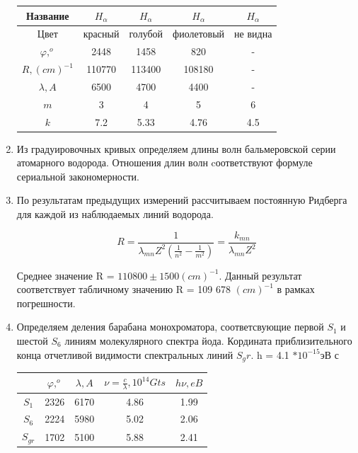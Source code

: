\documentclass[a4paper,12pt]{article}
\begin{document}
\begin{enumerate}
  \begin{table}[H]
\begin{center}
\begin{tabular}{|c|c|c|c|c|}
\hline Название&$H_{\alpha}$&$H_{\alpha}$&$H_{\alpha}$&$H_{\alpha}$\\
\hline Цвет&красный&голубой&фиолетовый&не видна\\
\hline $\varphi , ^{o}$&2448&1458&820&-\\
\hline $R, (cm)^{-1}$&110770&113400&108180&-\\
\hline $\lambda , A$&6500&4700&4400&-\\
\hline $m$&3&4&5&6\\
\hline $k$&7.2&5.33&4.76&4.5\\
\hline 
\end{tabular}
\end{center}
\end{table}

\item Из градуировочных кривых определяем длины волн бальмеровской серии атомарного водорода. Отношения длин волн cоответствуют формуле сериальной закономерности.


\item По результатам предыдущих измерений рассчитываем постоянную Ридберга для каждой из наблюдаемых линий водорода.

\[R = \frac{1}{\lambda_{mn} Z^2 (\frac{1}{n^2} - \frac{1}{m^2})} = \frac{k_{mn}}{\lambda_{mn} Z^2}\]

Среднее значение R = $110800 \pm 1500 (cm)^{-1}$. Данный результат соответствует табличному значению R = 109 678 $(cm)^{-1}$ в рамках погрешности.


\item Определяем деления барабана монохроматора, соответсвующие первой $S_1$ и шестой $S_6$ линиям молекулярного спектра йода. Кордината приблизительного конца отчетливой видимости спектральных линий $S_gr$. h = 4.1 $*10^{-15}$эВ с


  \begin{table}[H]
\begin{center}
\begin{tabular}{|c|c|c|c|c|}
\hline &$\varphi, ^{o}$&$\lambda ,A$&$\nu = \frac{c}{\lambda} ,10^{14} Gts $&$h\nu, eB$\\
\hline $S_1$&2326&6170&4.86&1.99\\
\hline $S_6$&2224&5980&5.02&2.06\\
\hline $S_{gr}$&1702&5100&5.88&2.41\\


\end{tabular}
\end{center}
\end{table}
\end{enumerate}
\end{document}
